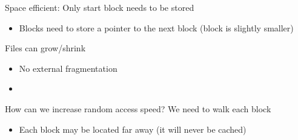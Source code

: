 \begin{slide}
    
    
    Space efficient: Only start block needs to be stored
	\begin{itemize}
		\item Blocks need to store a pointer to the next block (block is slightly smaller)
	\end{itemize}
    \bigskip

    Files can grow/shrink
	\begin{itemize}
		\item No external fragmentation
		\item
	\end{itemize}
	\bigskip

    How can we increase random access speed? We need to walk each block
	\begin{itemize}
		\item Each block may be located far away (it will never be cached)
	\end{itemize}

\end{slide}

